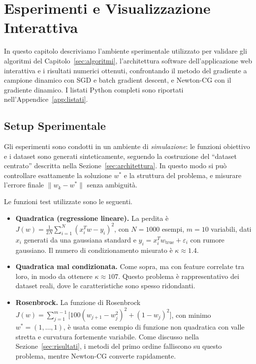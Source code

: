 \section{Esperimenti e Visualizzazione Interattiva}\label{sec:esperimenti}

In questo capitolo descriviamo l'ambiente sperimentale utilizzato per
validare gli algoritmi del Capitolo~\ref{sec:algoritmi}, l'architettura
software dell'applicazione web interattiva e i risultati numerici ottenuti,
confrontando il metodo del gradiente a campione dinamico con SGD e batch
gradient descent, e Newton-CG con il gradiente dinamico. I listati Python
completi sono riportati nell'Appendice~\ref{app:listati}.

\subsection{Setup Sperimentale}\label{sec:setup}

Gli esperimenti sono condotti in un ambiente di \emph{simulazione}: le
funzioni obiettivo e i dataset sono generati sinteticamente, seguendo la
costruzione del ``dataset centrato'' descritta nella
Sezione~\ref{sec:architettura}. In questo modo si può controllare esattamente
la soluzione $w^*$ e la struttura del problema, e misurare l'errore finale
$\|w_k - w^*\|$ senza ambiguità.

Le funzioni test utilizzate sono le seguenti.

\begin{itemize}
  \item \textbf{Quadratica (regressione lineare).} La perdita è
  $J(w) = \frac{1}{2N}\sum_{i=1}^{N}(x_i^T w - y_i)^2$, con $N = 1000$ esempi,
  $m = 10$ variabili, dati $x_i$ generati da una gaussiana standard e
  $y_i = x_i^T w_{\mathrm{true}} + \varepsilon_i$ con rumore gaussiano.
  Il numero di condizionamento misurato è $\kappa \approx 1.4$.
  \item \textbf{Quadratica mal condizionata.} Come sopra, ma con feature
  correlate tra loro, in modo da ottenere $\kappa \approx 107$. Questo
  problema è rappresentativo dei dataset reali, dove le caratteristiche sono
  spesso ridondanti.
  \item \textbf{Rosenbrock.} La funzione di Rosenbrock
  $J(w) = \sum_{j=1}^{m-1}\bigl[100(w_{j+1}-w_j^2)^2 + (1-w_j)^2\bigr]$,
  con minimo $w^* = (1,\dots,1)$, è usata come esempio di funzione non
  quadratica con valle stretta e curvatura fortemente variabile. Come
  discusso nella Sezione~\ref{sec:risultati}, i metodi del primo ordine
  falliscono su questo problema, mentre Newton-CG converte rapidamente.
\end{itemize}


